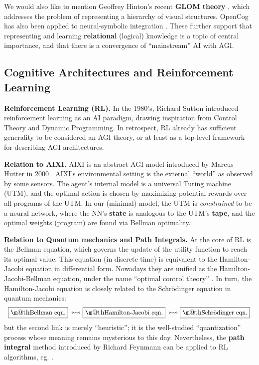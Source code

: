 \documentclass[orivec]{llncs}
\makeatletter
\renewcommand{\boxed}[1]{\fbox{\m@th$\displaystyle\scalebox{0.9}{#1}$} \,}
\makeatother
\begin{document}
We would also like to mention Geoffrey Hinton's recent \textbf{GLOM theory} \cite{Hinton2021}, which addresses the problem of representing a hierarchy of visual structures.  OpenCog has also been applied to neural-symbolic integration \cite{Goertzel2009} \cite{Potapov2019}.  These further support that representing and learning \textbf{relational} (logical) knowledge is a topic of central importance, and that there is a convergence of ``mainstream'' AI with AGI.

\subsection{Cognitive Architectures and Reinforcement Learning}

\textbf{Reinforcement Learning (RL).}  In the 1980's, Richard Sutton \cite{Sutton1984} introduced reinforcement learning as an AI paradigm, drawing inspiration from Control Theory and Dynamic Programming.  In retrospect, RL already has sufficient generality to be considered an AGI theory, or at least as a top-level framework for describing AGI architectures.

\textbf{Relation to AIXI.}  AIXI is an abstract AGI model introduced by Marcus Hutter in 2000 \cite{Hutter2005}.  AIXI's environmental setting is the external ``world'' as observed by some sensors.  The agent's internal model is a universal Turing machine (UTM), and the optimal action is chosen by maximizing potential rewards over all programs of the UTM.  In our (minimal) model, the UTM is \textit{constrained} to be a neural network, where the NN's \textbf{state} is analogous to the UTM's \textbf{tape}, and the optimal weights (program) are found via Bellman optimality.

\textbf{Relation to Quantum mechanics and Path Integrals.}  At the core of RL is the Bellman equation, which governs the update of the utility function to reach its optimal value.  This equation (in discrete time) is equivalent to the Hamilton-Jacobi equation in differential form.  Nowadays they are unified as the Hamilton-Jacobi-Bellman equation, under the name ``optimal control theory'' \cite{Liberzon2012}.  In turn, the Hamilton-Jacobi equation is closely related to the Schr\"{o}dinger equation in quantum mechanics:
\begin{equation}
\boxed{\mbox{Bellman eqn.}} \leftrightsquigarrow \boxed{\mbox{Hamilton-Jacobi eqn.}} \leftrightsquigarrow \boxed{\mbox{Schr\"{o}dinger eqn.}}
\end{equation}
but the second link is merely ``heuristic'';  it is the well-studied ``quantization'' process whose meaning remains mysterious to this day.  Nevertheless, the \textbf{path integral} method introduced by Richard Feynmann can be applied to RL algorithms, eg. \cite{Kappen2007}.
\end{document}
